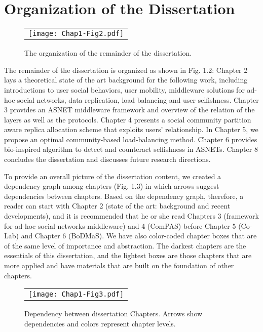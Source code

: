 \section{Organization of the Dissertation}\label{Chap1_03}
\begin{figure}[h]
\begin{center}
  \begin{tabular}{c}
  \texttt{[image: Chap1-Fig2.pdf]}
  \end{tabular}
  \caption{The organization of the remainder of the dissertation.}
\end{center}
\end{figure}
The remainder of the dissertation is organized as shown in Fig. 1.2: Chapter 2 lays a theoretical state of the art background for the following work, including introductions to user social behaviors, user mobility, middleware solutions for ad-hoc social networks, data replication, load balancing and user selfishness. Chapter 3 provides an ASNET middleware framework and overview of the relation of the layers as well as the protocols. Chapter 4 presents a social community partition aware replica allocation scheme that exploits users' relationship. In Chapter 5, we propose an optimal community-based load-balancing method. Chapter 6 provides bio-inspired algorithm to detect and counteract selfishness in ASNETs. Chapter 8 concludes the dissertation and discusses future research directions.

To provide an overall picture of the dissertation content, we created a dependency graph among chapters (Fig. 1.3) in which arrows suggest dependencies between chapters. Based on the dependency graph, therefore, a reader can start with Chapter 2 (state of the art: background and recent developments), and it is recommended that he or she read Chapters 3 (framework for ad-hoc social networks middleware) and 4 (ComPAS) before Chapter 5 (Co-Lab) and Chapter 6 (BoDMaS). We have also color-coded chapter boxes that are of the same level of importance and abstraction. The darkest chapters are the essentials of this dissertation, and the lightest boxes are those chapters that are more applied and have materials that are built on the foundation of other chapters.

\begin{figure}[h]
\begin{center}
  \begin{tabular}{c}
  \texttt{[image: Chap1-Fig3.pdf]}
  \end{tabular}
  \caption{Dependency between dissertation Chapters. Arrows show dependencies and colors represent chapter levels.}
\end{center}
\end{figure}
